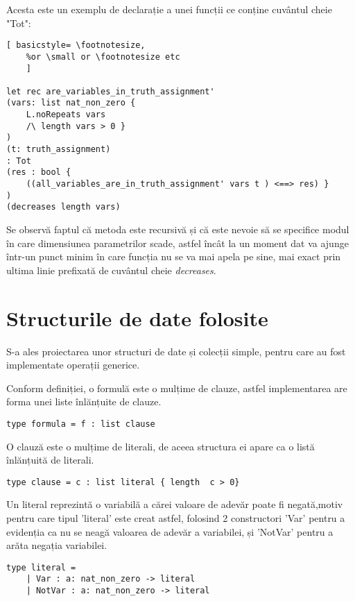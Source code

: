 Acesta este un exemplu de declarație a unei funcții ce conține cuvântul cheie "Tot":

\begin{lstlisting}[	basicstyle= \footnotesize, 
	%or \small or \footnotesize etc
	]

let rec are_variables_in_truth_assignment' 
(vars: list nat_non_zero { 
	L.noRepeats vars 
	/\ length vars > 0 }
) 
(t: truth_assignment) 
: Tot 
(res : bool { 
	((all_variables_are_in_truth_assignment' vars t ) <==> res) }
) 
(decreases length vars)

\end{lstlisting}

Se observă faptul că metoda este recursivă și că este nevoie să se specifice modul în care dimensiunea parametrilor scade,  astfel încât la un moment dat va ajunge într-un punct minim în care funcția nu se va mai apela pe sine, mai exact prin ultima linie prefixată de cuvântul cheie \textit{decreases}.

\section{Structurile de date folosite}

S-a ales proiectarea unor structuri de date și colecții simple, pentru care au fost implementate operații generice.

Conform definiției, o formulă este o mulțime de clauze, astfel implementarea are forma unei liste înlănțuite de clauze.

\begin{lstlisting}[]
	type formula = f : list clause 
	\end{lstlisting}

O clauză este o mulțime de literali, de aceea structura ei apare ca o listă înlănțuită de literali.

\begin{lstlisting}[]
	type clause = c : list literal { length  c > 0} 
\end{lstlisting}

Un literal reprezintă o variabilă a cărei valoare de adevăr poate fi negată,\newline  motiv pentru care tipul 'literal' este creat astfel, folosind 2 constructori 'Var' pentru a evidenția ca nu se neagă valoarea de adevăr a variabilei, și 'NotVar' pentru a arăta negația variabilei.

\begin{lstlisting}[]
type literal = 
	| Var : a: nat_non_zero -> literal
	| NotVar : a: nat_non_zero -> literal
\end{lstlisting}

